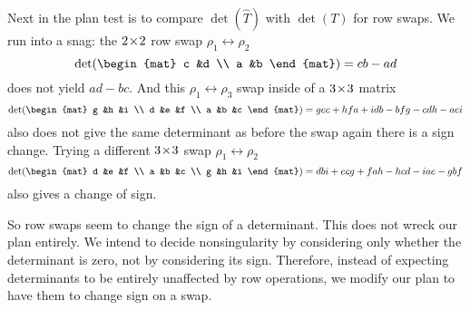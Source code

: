 Next in the plan test is to compare \( \det(\hat{T}) \) with 
\( \det(T) \) for row swaps.
We run into a snag:
the \(2 \! \times \! 2\) row swap $\rho_1\leftrightarrow\rho_2$
  \begin{equation*}
     \det(
       \begin{mat}
         c  &d \\
         a  &b
       \end{mat}
     )
     = cb - ad
  \end{equation*}
does not yield \( ad-bc \).
And this $\rho_1\leftrightarrow\rho_3$ swap inside of a \(3 \! \times \! 3\) matrix
\begin{equation*}
   \det(
     \begin{mat}
        g  &h  &i \\
        d  &e  &f \\
        a  &b  &c
     \end{mat}
   )
   = gec + hfa + idb - bfg - cdh - aei
\end{equation*}
also does not give the same determinant as before the swap \Dash  again 
there is a sign change.
Trying a different \(3 \! \times \! 3\) swap $\rho_1\leftrightarrow\rho_2$ 
\begin{equation*}
   \det(
     \begin{mat}
        d  &e  &f \\
        a  &b  &c \\
        g  &h  &i
     \end{mat}
   )
   = dbi + ecg + fah - hcd - iae - gbf
\end{equation*}
also gives a change of sign.

So row swaps seem 
to change the sign of a determinant.
This does not wreck our plan entirely.
We intend to decide nonsingularity by considering
only whether the determinant is zero, not by considering its sign.
Therefore, instead of expecting determinants to be
entirely unaffected by row operations, we modify our plan to 
have them to change sign on a swap.

